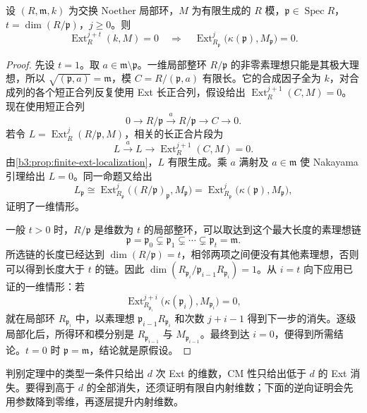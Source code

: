 \begin{lemma}\label{b3:lem:bass-ext-localization}
	设 \((R,\mathfrak m,k)\) 为交换 Noether 局部环，\(M\) 为有限生成的 \(R\) 模，\(\mathfrak p\in\operatorname{Spec}R\)，\(t=\dim(R/\mathfrak p)\)，\(j\ge0\)。则
	\[
		\operatorname{Ext}_R^{j+t}(k,M)=0 \quad\Longrightarrow\quad \operatorname{Ext}_{R_{\mathfrak p}}^j \bigl(\kappa(\mathfrak p),M_{\mathfrak p}\bigr)=0.
	\]
\end{lemma}
\begin{proof}
	先设 \(t=1\)。取 \(a\in\mathfrak m\setminus\mathfrak p\)。一维局部整环 \(R/\mathfrak p\) 的非零素理想只能是其极大理想，所以 \(\sqrt{(\mathfrak p,a)}=\mathfrak m\)，模 \(C=R/(\mathfrak p,a)\) 有限长。它的合成因子全为 \(k\)，对合成列的各个短正合列反复使用 Ext 长正合列，假设给出 \(\operatorname{Ext}_R^{j+1}(C,M)=0\)。现在使用短正合列
	\[
		0\longrightarrow R/\mathfrak p\xrightarrow{a}R/\mathfrak p \longrightarrow C\longrightarrow0.
	\]
	若令 \(L=\operatorname{Ext}_R^j(R/\mathfrak p,M)\)，相关的长正合片段为
	\[
		L\xrightarrow{a}L\longrightarrow\operatorname{Ext}_R^{j+1}(C,M)=0.
	\]
	由\cref{b3:prop:finite-ext-localization}，\(L\) 有限生成。乘 \(a\) 满射及 \(a\in\mathfrak m\) 使 Nakayama 引理给出 \(L=0\)。同一命题又给出
	\[
		L_{\mathfrak p}\cong \operatorname{Ext}_{R_{\mathfrak p}}^j \bigl((R/\mathfrak p)_{\mathfrak p},M_{\mathfrak p}\bigr) =\operatorname{Ext}_{R_{\mathfrak p}}^j \bigl(\kappa(\mathfrak p),M_{\mathfrak p}\bigr),
	\]
	证明了一维情形。

	一般 \(t>0\) 时，\(R/\mathfrak p\) 是维数为 \(t\) 的局部整环，可以取达到这个最大长度的素理想链
	\[
		\mathfrak p=\mathfrak p_0\subsetneq\mathfrak p_1 \subsetneq\cdots\subsetneq\mathfrak p_t=\mathfrak m.
	\]
	所选链的长度已经达到 \(\dim(R/\mathfrak p)=t\)，相邻两项之间便没有其他素理想，否则可以得到长度大于 \(t\) 的链。因此 \(\dim(R_{\mathfrak p_i}/\mathfrak p_{i-1}R_{\mathfrak p_i})=1\)。从 \(i=t\) 向下应用已证的一维情形：若
	\[
		\operatorname{Ext}_{R_{\mathfrak p_i}}^{j+i} \bigl(\kappa(\mathfrak p_i),M_{\mathfrak p_i}\bigr)=0,
	\]
	就在局部环 \(R_{\mathfrak p_i}\) 中，以素理想 \(\mathfrak p_{i-1}R_{\mathfrak p_i}\) 和次数 \(j+i-1\) 得到下一步的消失。逐级局部化后，所得环和模分别是 \(R_{\mathfrak p_{i-1}}\) 与 \(M_{\mathfrak p_{i-1}}\)。最终到达 \(i=0\)，便得到所需结论。\(t=0\) 时 \(\mathfrak p=\mathfrak m\)，结论就是原假设。
\end{proof}

判别定理中的类型一条件只给出 \(d\) 次 Ext 的维数，CM 性只给出低于 \(d\) 的 Ext 消失。要得到高于 \(d\) 的全部消失，还须证明有限自内射维数；下面的逆向证明会先用参数降到零维，再逐层提升内射维数。

